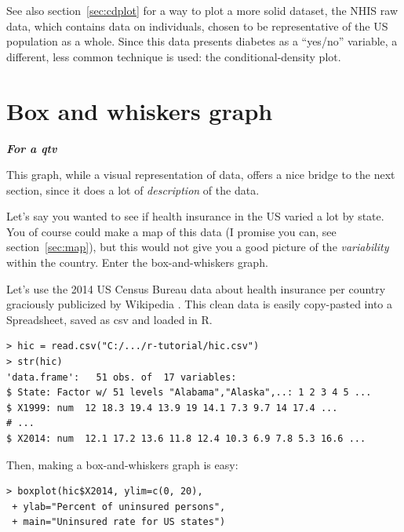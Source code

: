 \documentclass{report}
\newcommand{\notefor}[1]{\hfill\textbf{\textit{#1}}}
\begin{document}
	See also section~\ref{sec:cdplot} for a way to plot a more solid dataset, the NHIS raw data, which contains data on individuals, chosen to be representative of the US population as a whole. Since this data presents diabetes as a ``yes/no'' variable, a different, less common technique is used: the conditional-density plot.
	
	\section{Box and whiskers graph}
	\notefor{For a \gls{qtv}}
	
	This graph, while a visual representation of data, offers a nice bridge to the next section, since it does a lot of \emph{description} of the data.
	
	Let's say you wanted to see if health insurance in the US varied a lot by state. You of course could make a map of this data (I promise you can, see section~\ref{sec:map}), but this would not give you a good picture of the \emph{variability} within the country. Enter the box-and-whiskers graph.
	
	Let's use the 2014 US Census Bureau data about health insurance per country graciously publicized by Wikipedia \cite{hic}. This clean data is easily copy-pasted into a Spreadsheet, saved as csv and loaded in R.
	\begin{verbatim}
> hic = read.csv("C:/.../r-tutorial/hic.csv")
> str(hic)
'data.frame':   51 obs. of  17 variables:
$ State: Factor w/ 51 levels "Alabama","Alaska",..: 1 2 3 4 5 ...
$ X1999: num  12 18.3 19.4 13.9 19 14.1 7.3 9.7 14 17.4 ...
# ...
$ X2014: num  12.1 17.2 13.6 11.8 12.4 10.3 6.9 7.8 5.3 16.6 ...
	\end{verbatim}
	
	Then, making a box-and-whiskers graph is easy:
	\begin{verbatim}
> boxplot(hic$X2014, ylim=c(0, 20),
 + ylab="Percent of uninsured persons", 
 + main="Uninsured rate for US states")
	\end{verbatim}
	
\end{document}
